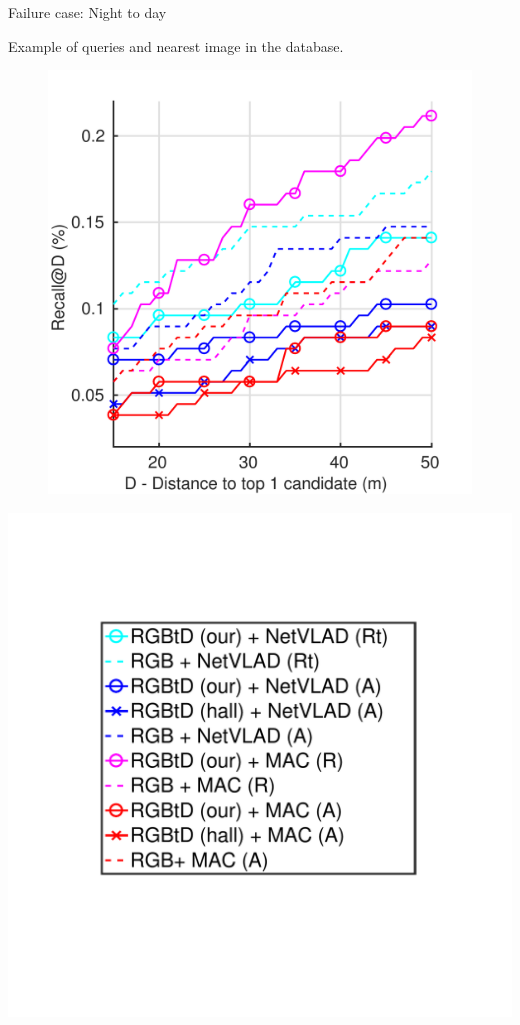 \begin{frame}{Failure case: Night to day}
\begin{minipage}{0.27\linewidth}
			{\scriptsize Example of queries and nearest image in the database.}
	\end{minipage}\hfill
	\begin{minipage}{0.49\linewidth}
		\centering
		\begin{figure}
			\includegraphics[width=0.9\linewidth]{vect/res/night}
		\end{figure}
	\end{minipage}\hfill
	\begin{minipage}{0.2\linewidth}
			\includegraphics[trim={90 140 95 100},clip,width=\linewidth]{vect/res/legend}	

\end{minipage}
\end{frame}
